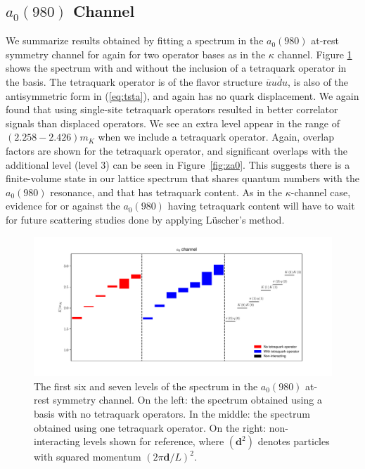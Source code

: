 \subsection{$a_0(980)$ Channel}
We summarize results obtained by fitting a spectrum in the $a_0(980)$ at-rest symmetry channel for again for two operator bases as in the $\kappa$ channel. Figure \ref{fig:a0_spectrum} shows the spectrum with and without the inclusion of a tetraquark operator in the basis. The tetraquark operator is of the flavor structure $\overline u u \overline d u$, is also of the antisymmetric form in (\ref{eq:tsta}), and again has no quark displacement. We again found that using single-site tetraquark operators resulted in better correlator signals than displaced operators. We see an extra level appear in the range of $(2.258 - 2.426) m_K$ when we include a tetraquark operator. Again, overlap factors are shown for the tetraquark operator, and significant overlaps with the additional level (level 3) can be seen in Figure~\ref{fig:za0}. This suggests there is a finite-volume state in our lattice spectrum that shares quantum numbers with the $a_0(980)$ resonance, and that has tetraquark content. As in the $\kappa$-channel case, evidence for or against the $a_0(980)$ having tetraquark content will have to wait for future scattering studies done by applying Lüscher's method.
\begin{figure}
  \includegraphics[scale=0.7]{figures/a1gm_staircase.pdf}
  \caption{The first six and seven levels of the spectrum in the $a_0(980)$ at-rest symmetry channel. On the left: the spectrum obtained using a basis with no tetraquark operators. In the middle: the spectrum obtained using one tetraquark operator. On the right: non-interacting levels shown for reference, where $(\boldsymbol{d}^2)$ denotes particles with squared momentum $(2\pi\boldsymbol{d}/L)^2$.}\label{fig:a0_spectrum}
\end{figure}